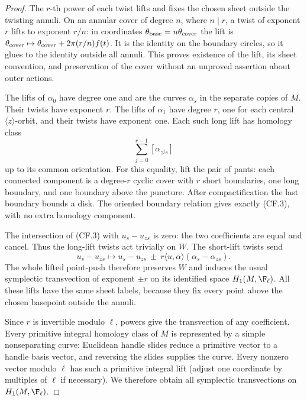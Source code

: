 \begin{proof}
The $r$-th power of each twist lifts and fixes the chosen sheet
outside the twisting annuli. On an annular cover of degree $n$,
where $n\mid r$, a twist of exponent $r$ lifts to exponent $r/n$:
in coordinates $\theta_{\rm base}=n\theta_{\rm cover}$ the lift is
$\theta_{\rm cover}\mapsto\theta_{\rm cover}+2\pi(r/n)f(t)$.
It is the identity on the boundary circles, so it glues to the
identity outside all annuli. This proves existence of the lift,
its sheet convention, and preservation of the cover without an
unproved assertion about outer actions.

The lifts of $\alpha_0$ have degree one and are the curves
$\alpha_s$ in the separate copies of $M$. Their twists have
exponent $r$. The lifts of $\alpha_1$ have degree $r$, one for
each central $\langle z\rangle$-orbit, and their twists have
exponent one. Each such long lift has homology class
\[
                        \sum_{j=0}^{r-1}[\alpha_{z^j s}]
                                                               \tag{CF.3}
\]
up to its common orientation. For this equality, lift the pair of
pants: each connected component is a degree-$r$ cyclic cover with
$r$ short boundaries, one long boundary, and one boundary above the
puncture. After compactification the last boundary bounds a disk.
The oriented boundary relation gives exactly (CF.3), with no extra
homology component.

The intersection of (CF.3) with $u_s-u_{zs}$ is zero: the two
coefficients are equal and cancel. Thus the long-lift twists act
trivially on $W$. The short-lift twists send
\[
 u_s-u_{zs}\longmapsto
 u_s-u_{zs}\ \mathbin{\pm}\ r\langle u,\alpha\rangle
                          (\alpha_s-\alpha_{zs}).              \tag{CF.4}
\]
The whole lifted point-push therefore preserves $W$ and induces the
usual symplectic transvection of exponent $\pm r$ on its identified
space $H_1(M,\F_\ell)$. All these lifts have the same sheet labels,
because they fix every point above the chosen basepoint outside the
annuli.

Since $r$ is invertible modulo $\ell$, powers give the transvection
of any coefficient. Every primitive integral homology class of $M$
is represented by a simple nonseparating curve: Euclidean handle
slides reduce a primitive vector to a handle basis vector, and
reversing the slides supplies the curve. Every nonzero vector modulo
$\ell$ has such a primitive integral lift (adjust one coordinate
by multiples of $\ell$ if necessary). We therefore obtain all
symplectic transvections on $H_1(M,\F_\ell)$.


\end{proof}
